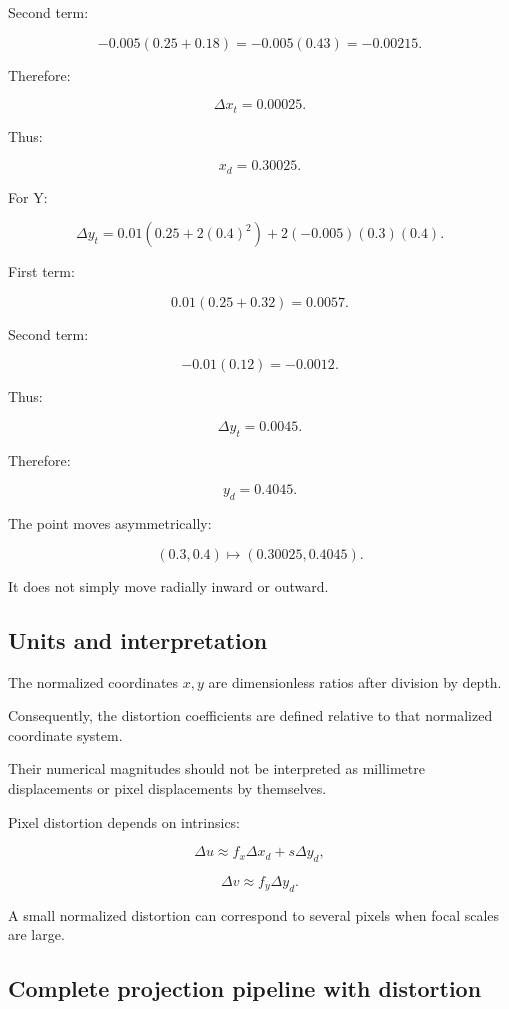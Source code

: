 Second term:

\[
 -0.005(0.25+0.18) =-0.005(0.43) =-0.00215.
\]

Therefore:

\[
 \boxed{ \Delta x_t=0.00025 }.
\]

Thus:

\[
 \boxed{x_d=0.30025}.
\]

For Y:

\[
 \Delta y_t= 0.01(0.25+2(0.4)^2) +2(-0.005)(0.3)(0.4).
\]

First term:

\[
 0.01(0.25+0.32)=0.0057.
\]

Second term:

\[
 -0.01(0.12)=-0.0012.
\]

Thus:

\[
 \boxed{ \Delta y_t=0.0045 }.
\]

Therefore:

\[
 \boxed{y_d=0.4045}.
\]

The point moves asymmetrically:

\[
 (0.3,0.4)\mapsto(0.30025,0.4045).
\]

It does not simply move radially inward or outward.

\subsection{Units and interpretation}\label{02-foundations-ii-ch035-units-and-interpretation}

The normalized coordinates \(x,y\) are dimensionless ratios after division by depth.

Consequently, the distortion coefficients are defined relative to that normalized coordinate system.

Their numerical magnitudes should not be interpreted as millimetre displacements or pixel displacements by themselves.

Pixel distortion depends on intrinsics:

\[
 \Delta u\approx f_x\Delta x_d+s\Delta y_d,
\]

\[
 \Delta v\approx f_y\Delta y_d.
\]

A small normalized distortion can correspond to several pixels when focal scales are large.

\subsection{Complete projection pipeline with distortion}\label{02-foundations-ii-ch035-complete-projection-pipeline-with-distortion}

